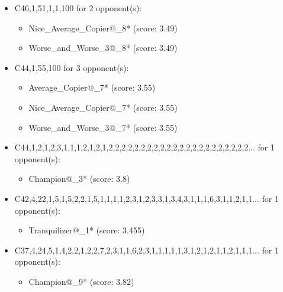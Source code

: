 \begin{appendices}
\begin{itemize}
    \item C46,1,51,1,1,100 for 2 opponent(s):
    \begin{multicols}{3}
         \begin{itemize}
            \item Nice\_Average\_Copier@\_8* (score: 3.49)
            \item Worse\_and\_Worse\_3@\_8* (score: 3.49)
        \end{itemize}
     \end{multicols}
     
    \item C44,1,55,100 for 3 opponent(s):
    \begin{multicols}{3}
         \begin{itemize}
            \item Average\_Copier@\_7* (score: 3.55)
            \item Nice\_Average\_Copier@\_7* (score: 3.55)
            \item Worse\_and\_Worse\_3@\_7* (score: 3.55)
        \end{itemize}
     \end{multicols}
     
    \item C44,1,2,1,2,3,1,1,1,2,1,2,1,2,2,2,2,2,2,2,2,2,2,2,2,2,2,2,2,2,2,2,2,2,2... for 1 opponent(s):
    \begin{multicols}{3}
         \begin{itemize}
            \item Champion@\_3* (score: 3.8)
        \end{itemize}
     \end{multicols}
     
    \item C42,4,22,1,5,1,5,2,2,1,5,1,1,1,1,2,3,1,2,3,3,1,3,4,3,1,1,1,6,3,1,1,2,1,1... for 1 opponent(s):
    \begin{multicols}{3}
         \begin{itemize}
            \item Tranquilizer@\_1* (score: 3.455)
        \end{itemize}
     \end{multicols}
     
    \item C37,4,24,5,1,4,2,2,1,2,2,7,2,3,1,1,6,2,3,1,1,1,1,1,3,1,2,1,2,1,1,2,1,1,1... for 1 opponent(s):
    \begin{multicols}{3}
         \begin{itemize}
            \item Champion@\_9* (score: 3.82)
        \end{itemize}
     \end{multicols}
     

\end{itemize}
\end{appendices}
